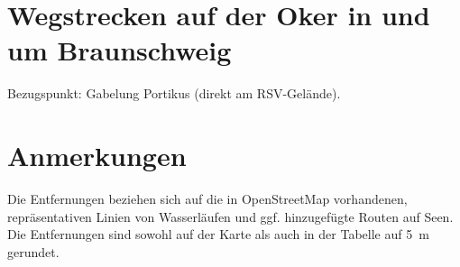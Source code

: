 \documentclass{article}
\begin{document}
    \section*{Wegstrecken auf der Oker in und um Braunschweig}
    Bezugspunkt: Gabelung Portikus (direkt am RSV-Gelände).
            
    
    \section*{Anmerkungen}
    Die Entfernungen beziehen sich auf die in OpenStreetMap vorhandenen,
    repräsentativen Linien von Wasserläufen und ggf. hinzugefügte Routen auf
    Seen. Die Entfernungen sind sowohl auf der Karte als auch in der Tabelle auf 5~m gerundet.
\end{document}
